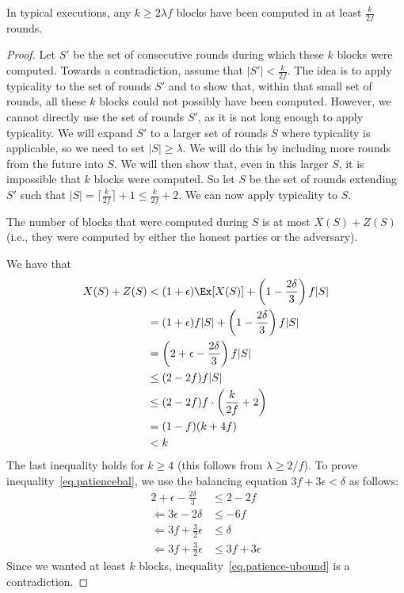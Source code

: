\begin{lemma}\label{lem.patience}
In typical executions, any $k \geq 2\lambda f$ blocks have been computed in at least $\frac{k}{2f}$ rounds.
\end{lemma}
\begin{proof}
Let $S'$ be the set of consecutive rounds during which these $k$ blocks were computed. Towards a contradiction, assume that $|S'| < \frac{k}{2f}$. The idea is to apply typicality to the set of rounds $S'$ and to show that, within that small set of rounds, all these $k$ blocks could not possibly have been computed. However, we cannot directly use the set of rounds $S'$, as it is not long enough to apply typicality. We will expand $S'$ to a larger set of rounds $S$ where typicality is applicable, so we need to set $|S| \geq \lambda$. We will do this by including more rounds from the future into $S$. We will then show that, even in this larger $S$, it is impossible that $k$ blocks were computed. So let $S$ be the set of rounds extending $S'$ such that $|S| = \lceil \frac{k}{2f} \rceil + 1 \leq \frac{k}{2f} + 2$. We can now apply typicality to $S$.

The number of blocks that were computed during $S$ is at most $X(S) + Z(S)$ (i.e., they were computed by either the honest parties or the adversary).

We have that
\begin{align}
    X(S) + Z(S) &< (1+\epsilon)\Ex[X(S)] + \left(1 - \frac{2\delta}{3}\right)f|S|\\
    &=(1+\epsilon)f|S|+ \left(1 - \frac{2\delta}{3}\right)f|S|\\
    &= \left(2 + \epsilon - \frac{2\delta}{3}\right)f|S|\\
    &\leq (2-2f)f|S|\label{eq.patiencebal}\\
    & \leq (2-2f)f \cdot \left(\frac{k}{2f} + 2\right)\\
    & = (1-f)(k+4f) \\
    & < k\label{eq.patience-ubound}
\end{align}
The last inequality holds for $k \geq 4$ (this follows from $\lambda \geq 2/f$).
To prove inequality~\ref{eq.patiencebal}, we use the balancing equation $3f + 3\epsilon < \delta$ as follows:
\begin{align}
  2 + \epsilon - \frac{2\delta}{3} &\leq 2-2f\\
  \Leftarrow 3\epsilon - 2\delta &\leq -6f\\
  \Leftarrow 3f + \frac{3}{2}\epsilon &\leq \delta\\
  \Leftarrow 3f + \frac{3}{2}\epsilon &\leq 3f + 3\epsilon
\end{align}
Since we wanted at least $k$ blocks, inequality~\ref{eq.patience-ubound} is a contradiction.
\end{proof}

